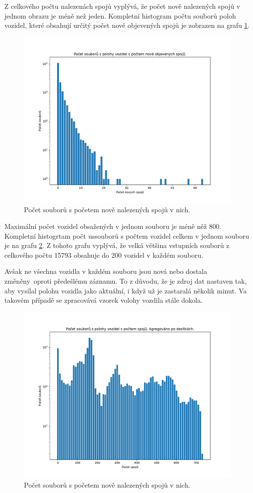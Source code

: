 \bigbreak

Z celkového počtu nalezenách spojů vyplývá, že počet nově nalezených spojů v jednom obrazu je méně než jeden. Kompletní histogram počtu souborů poloh vozidel, které obsahují určitý počet nově objevených spojů je zobrazen na grafu \ref{fig:vehicle_pos_x_new_trips}.

\begin{figure}
	\centering
  \includegraphics[width=0.7\linewidth]{../img/vehicle_pos_x_new_trips}
  \caption{Počet souborů s početem nově nalezených spojů v nich.}
  \label{fig:vehicle_pos_x_new_trips}
\end{figure}

Maximální počet vozidel obsažených v jednom souboru je méně něž 800. Kompletní histogrtam počt ussouborů s počtem vozidel celkem v jednom souboru je na grafu \ref{fig:vehicle_pos_x_all_trips}. Z tohoto grafu vyplývá, že velká většina vstupních souborů z celkového počtu 15793 obsahuje do 200 vozidel v každém souboru.

\bigbreak

Avšak ne všechna vozidla v každém souboru jsou nová nebo dostala změněny oproti předešlému záznamu. To z důvodu, že je zdroj dat nastaven tak, aby vysílal polohu vozidla jako aktuální, i když už je zastaralá několik minut. Va takovém případě se zpracovává vzorek volohy vozdila stále dokola.

\begin{figure}
	\centering
  \includegraphics[width=0.7\linewidth]{../img/vehicle_pos_x_all_trips}
  \caption{Počet souborů s početem nově nalezených spojů v nich.}
  \label{fig:vehicle_pos_x_all_trips}
\end{figure}

